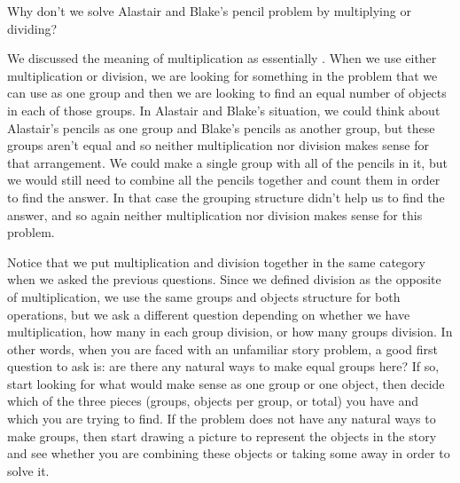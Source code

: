 \documentclass{ximera}
\begin{document}
\begin{question}
Why don't we solve Alastair and Blake's pencil problem by multiplying or dividing?

\begin{explanation}
We discussed the meaning of multiplication as essentially . When we use either multiplication or division, we are looking for something in the problem that we can use as one group and then we are looking to find an equal number of objects in each of those groups. In Alastair and Blake's situation, we could think about Alastair's pencils as one group and Blake's pencils as another group, but these groups aren't equal and so neither multiplication nor division makes sense for that arrangement. We could make a single group with all of the pencils in it, but we would still need to combine all the pencils together and count them in order to find the answer. In that case the grouping structure didn't help us to find the answer, and so again neither multiplication nor division makes sense for this problem.
\end{explanation}
\end{question}

Notice that we put multiplication and division together in the same category when we asked the previous questions. Since we defined division as the opposite of multiplication, we use the same groups and objects structure for both operations, but we ask a different question depending on whether we have multiplication, how many in each group division, or how many groups division. In other words, when you are faced with an unfamiliar story problem, a good first question to ask is: are there any natural ways to make equal groups here? If so, start looking for what would make sense as one group or one object, then decide which of the three pieces (groups, objects per group, or total) you have and which you are trying to find. If the problem does not have any natural ways to make groups, then start drawing a picture to represent the objects in the story and see whether you are combining these objects or taking some away in order to solve it.
\end{document}
